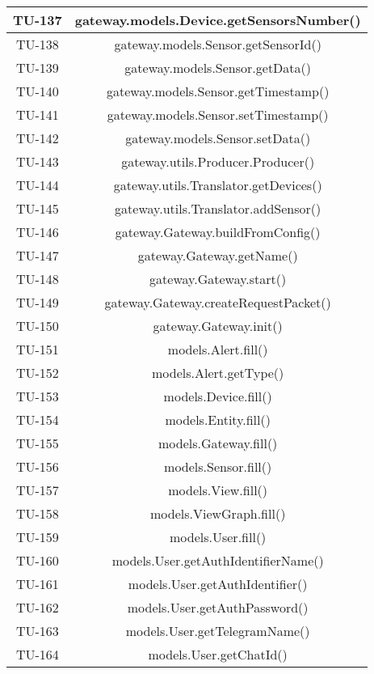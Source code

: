 \begin{center}
\begin{longtable}{|c|c|}
			\hline
			TU-137 & gateway.models.Device.getSensorsNumber() \\
			\hline
			TU-138 & gateway.models.Sensor.getSensorId() \\
			\hline
			TU-139 & gateway.models.Sensor.getData() \\
			\hline
			TU-140 & gateway.models.Sensor.getTimestamp() \\
			\hline
			TU-141 & gateway.models.Sensor.setTimestamp() \\
			\hline
			TU-142 & gateway.models.Sensor.setData() \\
			\hline
			TU-143 & gateway.utils.Producer.Producer() \\
			\hline
			TU-144 & gateway.utils.Translator.getDevices() \\
			\hline
			TU-145 & gateway.utils.Translator.addSensor() \\
			\hline
			TU-146 & gateway.Gateway.buildFromConfig() \\
			\hline
			TU-147 & gateway.Gateway.getName() \\
			\hline
			TU-148 & gateway.Gateway.start() \\
			\hline
			TU-149 & gateway.Gateway.createRequestPacket() \\
			\hline
			TU-150 & gateway.Gateway.init() \\
			\hline
			TU-151 & models.Alert.fill() \\
			\hline
			TU-152 & models.Alert.getType() \\
			\hline
			TU-153 & models.Device.fill() \\
			\hline
			TU-154 & models.Entity.fill() \\
			\hline
			TU-155 & models.Gateway.fill() \\
			\hline
			TU-156 & models.Sensor.fill() \\
			\hline
			TU-157 & models.View.fill() \\
			\hline
			TU-158 & models.ViewGraph.fill() \\
			\hline
			TU-159 & models.User.fill() \\
			\hline
			TU-160 & models.User.getAuthIdentifierName() \\
			\hline
			TU-161 & models.User.getAuthIdentifier() \\
			\hline
			TU-162 & models.User.getAuthPassword() \\
			\hline
			TU-163 & models.User.getTelegramName() \\
			\hline
			TU-164 & models.User.getChatId() \\

\end{longtable}
\end{center}
